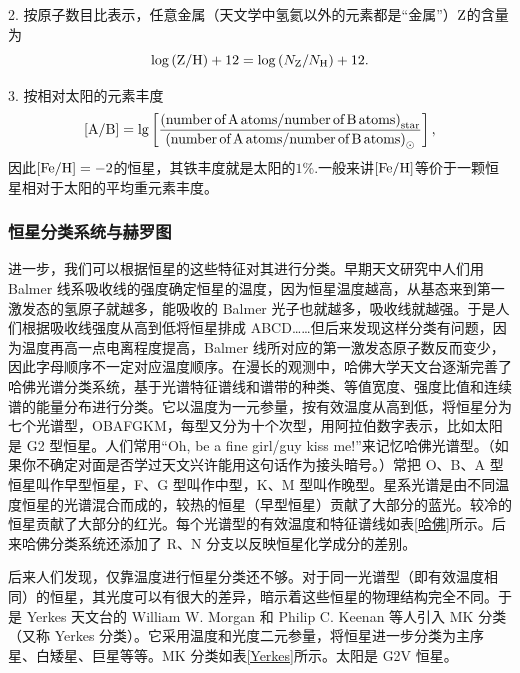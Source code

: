 \documentclass[../天体物理基础.tex]{subfiles}
\begin{document}
2. 按原子数目比表示，任意金属（天文学中氢氦以外的元素都是“金属”）$\ce{Z}$的含量为
\begin{equation}
\log\left(\ce{Z}/\ce{H}\right)+12=\log\left(N_{\ce{Z}}/N_{\ce{H}}\right)+12.
\end{equation}

3. 按相对太阳的元素丰度
\begin{equation}
\left[\ce{A}/\ce{B}\right]=\lg\left[\frac{\left(\textrm{number\,of\,A\,atoms/number\,of\,B\,atoms}\right)_{\text{star}}}{\left(\textrm{number\,of\,A\,atoms/number\,of\,B\,atoms}\right)_{\odot}}\right],
\end{equation}
因此$\left[\ce{Fe/H}\right]=-2$的恒星，其铁丰度就是太阳的$1\%$.一般来讲$\left[\ce{Fe/H}\right]$等价于一颗恒星相对于太阳的平均重元素丰度。

\subsubsection{恒星分类系统与赫罗图}
进一步，我们可以根据恒星的这些特征对其进行分类。早期天文研究中人们用 Balmer 线系吸收线的强度确定恒星的温度，因为恒星温度越高，从基态来到第一激发态的氢原子就越多，能吸收的 Balmer 光子也就越多，吸收线就越强。于是人们根据吸收线强度从高到低将恒星排成 ABCD……但后来发现这样分类有问题，因为温度再高一点电离程度提高，Balmer 线所对应的第一激发态原子数反而变少，因此字母顺序不一定对应温度顺序。在漫长的观测中，哈佛大学天文台逐渐完善了哈佛光谱分类系统，基于光谱特征谱线和谱带的种类、等值宽度、强度比值和连续谱的能量分布进行分类。它以温度为一元参量，按有效温度从高到低，将恒星分为七个光谱型，OBAFGKM，每型又分为十个次型，用阿拉伯数字表示，比如太阳是 G2 型恒星。人们常用``Oh, be a fine girl/guy kiss me!''来记忆哈佛光谱型。（如果你不确定对面是否学过天文兴许能用这句话作为接头暗号。）常把 O、B、A 型恒星叫作早型恒星，F、G 型叫作中型，K、M 型叫作晚型。星系光谱是由不同温度恒星的光谱混合而成的，较热的恒星（早型恒星）贡献了大部分的蓝光。较冷的恒星贡献了大部分的红光。每个光谱型的有效温度和特征谱线如表\ref{哈佛}所示。后来哈佛分类系统还添加了 R、N 分支以反映恒星化学成分的差别。

后来人们发现，仅靠温度进行恒星分类还不够。对于同一光谱型（即有效温度相同）的恒星，其光度可以有很大的差异，暗示着这些恒星的物理结构完全不同。于是 Yerkes 天文台的 William W. Morgan 和 Philip C. Keenan 等人引入 MK 分类（又称 Yerkes 分类）。它采用温度和光度二元参量，将恒星进一步分类为主序星、白矮星、巨星等等。MK 分类如表\ref{Yerkes}所示。太阳是 G2V 恒星。
\end{document}

